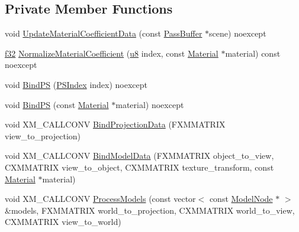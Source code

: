 \subsection*{Private Member Functions}
\begin{DoxyCompactItemize}
\item 
void \hyperlink{classmage_1_1_g_buffer_pass_a4b7e21f33c9d7cb8b9d3850b3977e11a}{Update\+Material\+Coefficient\+Data} (const \hyperlink{structmage_1_1_pass_buffer}{Pass\+Buffer} $\ast$scene) noexcept
\item 
\hyperlink{namespacemage_a6a44ad388483959dc4dff9f2aef91431}{f32} \hyperlink{classmage_1_1_g_buffer_pass_a5810afcec108273c1ad893b129ffc46c}{Normalize\+Material\+Coefficient} (\hyperlink{namespacemage_a5a362e2d56fc439362a80516ecae7828}{u8} index, const \hyperlink{structmage_1_1_material}{Material} $\ast$material) const noexcept
\item 
void \hyperlink{classmage_1_1_g_buffer_pass_a750c27aa6f562b53d62f845ce50e731d}{Bind\+PS} (\hyperlink{classmage_1_1_g_buffer_pass_a1dbae3cb33d9c90ce7eb8c119d576379}{P\+S\+Index} index) noexcept
\item 
void \hyperlink{classmage_1_1_g_buffer_pass_acf03db3d75a3dbacb5c002f6bc72e5ee}{Bind\+PS} (const \hyperlink{structmage_1_1_material}{Material} $\ast$material) noexcept
\item 
void X\+M\+\_\+\+C\+A\+L\+L\+C\+O\+NV \hyperlink{classmage_1_1_g_buffer_pass_a72d3723ec2cf336b62e46d551211e70d}{Bind\+Projection\+Data} (F\+X\+M\+M\+A\+T\+R\+IX view\+\_\+to\+\_\+projection)
\item 
void X\+M\+\_\+\+C\+A\+L\+L\+C\+O\+NV \hyperlink{classmage_1_1_g_buffer_pass_a5296050798e8430601e0f42d1f8327db}{Bind\+Model\+Data} (F\+X\+M\+M\+A\+T\+R\+IX object\+\_\+to\+\_\+view, C\+X\+M\+M\+A\+T\+R\+IX view\+\_\+to\+\_\+object, C\+X\+M\+M\+A\+T\+R\+IX texture\+\_\+transform, const \hyperlink{structmage_1_1_material}{Material} $\ast$material)
\item 
void X\+M\+\_\+\+C\+A\+L\+L\+C\+O\+NV \hyperlink{classmage_1_1_g_buffer_pass_abd4c5154aefd3d8e9befdb572b37f40d}{Process\+Models} (const vector$<$ const \hyperlink{classmage_1_1_model_node}{Model\+Node} $\ast$ $>$ \&models, F\+X\+M\+M\+A\+T\+R\+IX world\+\_\+to\+\_\+projection, C\+X\+M\+M\+A\+T\+R\+IX world\+\_\+to\+\_\+view, C\+X\+M\+M\+A\+T\+R\+IX view\+\_\+to\+\_\+world)
\end{DoxyCompactItemize}
